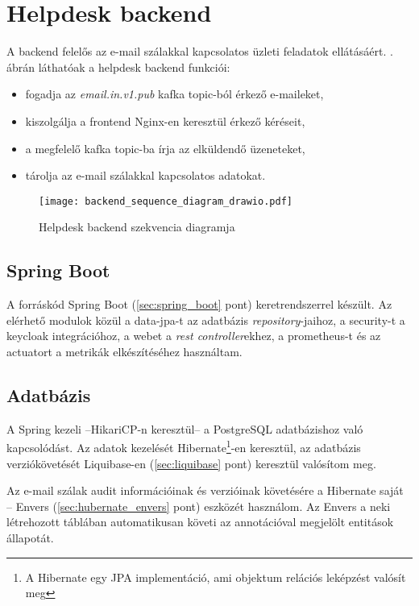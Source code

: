 \section{Helpdesk backend}\label{sec:backend}
A backend felelős az e-mail szálakkal kapcsolatos üzleti feladatok ellátásáért. . ábrán láthatóak a helpdesk backend funkciói:
\begin{itemize}
	\item fogadja az \textit{email.in.v1.pub} kafka topic-ból érkező e-maileket, 
	\item kiszolgálja a frontend Nginx-en keresztül érkező kéréseit,
	\item a megfelelő kafka topic-ba írja az elküldendő üzeneteket,
	\item tárolja az e-mail szálakkal kapcsolatos adatokat.
\end{itemize}


\begin{figure}[hbt] 
	\centering
	\texttt{[image: backend\_sequence\_diagram\_drawio.pdf]}
	\caption{Helpdesk backend szekvencia diagramja}
	\label{fig:backend_sequence_diagram}
\end{figure}


\subsection{Spring Boot}
A forráskód Spring Boot (\ref{sec:spring_boot} pont) keretrendszerrel készült. Az elérhető modulok közül a data-jpa-t az adatbázis \textit{repository}-jaihoz, a security-t a keycloak integrációhoz, a webet a \textit{rest controller}ekhez, a prometheus-t és az actuatort a metrikák elkészítéséhez használtam.	


\subsection{Adatbázis}\label{sec:adatbazis}
A Spring kezeli --HikariCP-n keresztül-- a PostgreSQL adatbázishoz való kapcsolódást.
Az adatok kezelését Hibernate\footnote{A Hibernate egy JPA implementáció, ami objektum relációs leképzést valósít meg}-en keresztül, az adatbázis verziókövetését Liquibase-en (\ref{sec:liquibase} pont) keresztül valósítom meg. 

Az e-mail szálak audit információinak és verzióinak követésére a Hibernate saját -- Envers (\ref{sec:hubernate_envers} pont) eszközét használom. Az Envers a neki létrehozott táblában automatikusan követi az annotációval megjelölt entitások állapotát.

